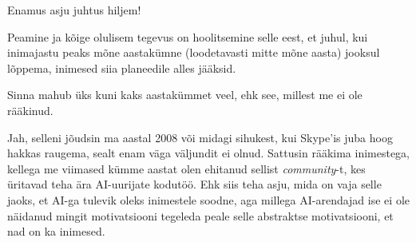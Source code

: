 
Enamus asju juhtus hiljem!


Peamine ja kõige olulisem tegevus on hoolitsemine selle eest, et juhul, kui 
inimajastu peaks mõne aastakümne (loodetavasti mitte mõne aasta) jooksul 
lõppema,  inimesed siia planeedile alles jääksid.


Sinna mahub üks kuni kaks aastakümmet veel, ehk see, millest me ei ole 
rääkinud. 


Jah, selleni jõudsin ma aastal 2008 või midagi sihukest, kui Skype'is juba hoog 
hakkas raugema, sealt enam väga väljundit ei olnud. Sattusin rääkima 
inimestega, kellega me viimased kümme aastat olen ehitanud sellist 
\emph{community}-t, kes üritavad teha ära AI-uurijate kodutöö. Ehk siis teha 
asju, mida on vaja selle jaoks, et AI-ga tulevik oleks inimestele soodne, aga 
millega AI-arendajad ise ei ole näidanud mingit motivatsiooni tegeleda peale 
selle abstraktse motivatsiooni, et nad on ka inimesed.

